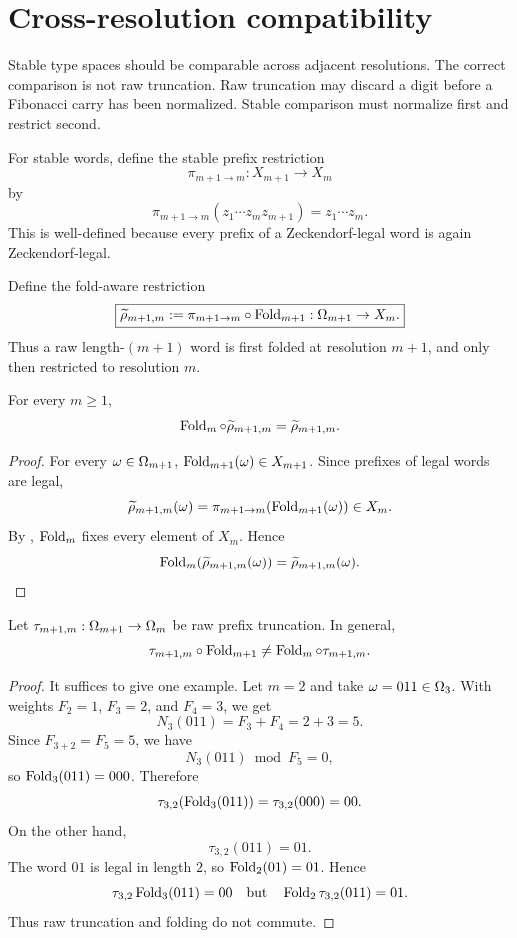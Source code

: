 \section{Cross-resolution compatibility}
\label{sec:cross-resolution}

Stable type spaces should be comparable across adjacent resolutions.  The correct comparison is not raw truncation.  Raw truncation may discard a digit before a Fibonacci carry has been normalized.  Stable comparison must normalize first and restrict second.

For stable words, define the stable prefix restriction
\[
\pi_{m+1\to m}:X_{m+1}\to X_m
\]
by
\[
\pi_{m+1\to m}(z_1\cdots z_mz_{m+1})=z_1\cdots z_m.
\]
This is well-defined because every prefix of a Zeckendorf-legal word is again Zeckendorf-legal.

Define the fold-aware restriction
\[
\boxed{
\widetilde\rho_{m+1,m}:=
\pi_{m+1\to m}\circ\operatorname{Fold}_{m+1}:
\Omega_{m+1}\to X_m.
}
\]
Thus a raw length-\((m+1)\) word is first folded at resolution \(m+1\), and only then restricted to resolution \(m\).

\begin{theorem}
\label{thm:cross-resolution-compatibility}
For every \(m\ge1\),
\[
\operatorname{Fold}_m\circ\widetilde\rho_{m+1,m}
=
\widetilde\rho_{m+1,m}.
\]
\end{theorem}

\begin{proof}
For every \(\omega\in\Omega_{m+1}\), \(\operatorname{Fold}_{m+1}(\omega)\in X_{m+1}\).  Since prefixes of legal words are legal,
\[
\widetilde\rho_{m+1,m}(\omega)=\pi_{m+1\to m}(\operatorname{Fold}_{m+1}(\omega))\in X_m.
\]
By , \(\operatorname{Fold}_m\) fixes every element of \(X_m\).  Hence
\[
\operatorname{Fold}_m(\widetilde\rho_{m+1,m}(\omega))
=
\widetilde\rho_{m+1,m}(\omega).
\]
\end{proof}

\begin{proposition}
\label{prop:naive-truncation-failure}
Let \(\tau_{m+1,m}:\Omega_{m+1}\to\Omega_m\) be raw prefix truncation.  In general,
\[
\tau_{m+1,m}\circ\operatorname{Fold}_{m+1}
\ne
\operatorname{Fold}_m\circ\tau_{m+1,m}.
\]
\end{proposition}

\begin{proof}
It suffices to give one example.  Let \(m=2\) and take \(\omega=011\in\Omega_3\).  With weights \(F_2=1\), \(F_3=2\), and \(F_4=3\), we get
\[
N_3(011)=F_3+F_4=2+3=5.
\]
Since \(F_{3+2}=F_5=5\), we have
\[
N_3(011)\bmod F_5=0,
\]
so \(\operatorname{Fold}_3(011)=000\).  Therefore
\[
\tau_{3,2}(\operatorname{Fold}_3(011))=\tau_{3,2}(000)=00.
\]
On the other hand,
\[
\tau_{3,2}(011)=01.
\]
The word \(01\) is legal in length \(2\), so \(\operatorname{Fold}_2(01)=01\).  Hence
\[
\tau_{3,2}\operatorname{Fold}_3(011)=00
\quad\text{but}\quad
\operatorname{Fold}_2\tau_{3,2}(011)=01.
\]
Thus raw truncation and folding do not commute.
\end{proof}

